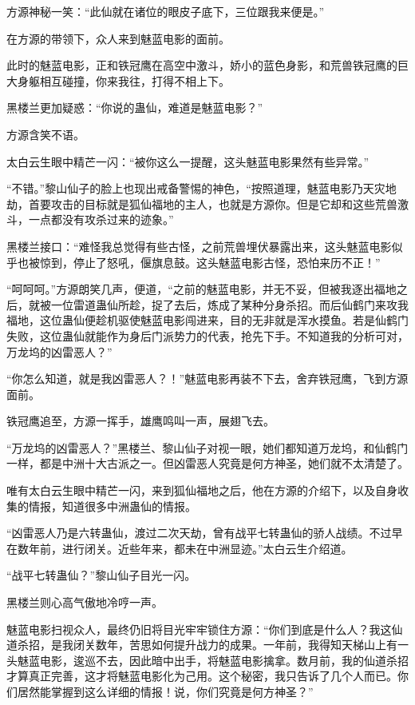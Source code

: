 
\begin{this_body}

方源神秘一笑：“此仙就在诸位的眼皮子底下，三位跟我来便是。”

在方源的带领下，众人来到魅蓝电影的面前。

此时的魅蓝电影，正和铁冠鹰在高空中激斗，娇小的蓝色身影，和荒兽铁冠鹰的巨大身躯相互碰撞，你来我往，打得不相上下。

黑楼兰更加疑惑：“你说的蛊仙，难道是魅蓝电影？”

方源含笑不语。

太白云生眼中精芒一闪：“被你这么一提醒，这头魅蓝电影果然有些异常。”

“不错。”黎山仙子的脸上也现出戒备警惕的神色，“按照道理，魅蓝电影乃天灾地劫，首要攻击的目标就是狐仙福地的主人，也就是方源你。但是它却和这些荒兽激斗，一点都没有攻杀过来的迹象。”

黑楼兰接口：“难怪我总觉得有些古怪，之前荒兽埋伏暴露出来，这头魅蓝电影似乎也被惊到，停止了怒吼，偃旗息鼓。这头魅蓝电影古怪，恐怕来历不正！”

“呵呵呵。”方源朗笑几声，便道，“之前的魅蓝电影，并无不妥，但被我逐出福地之后，就被一位雷道蛊仙所趁，捉了去后，炼成了某种分身杀招。而后仙鹤门来攻我福地，这位蛊仙便趁机驱使魅蓝电影闯进来，目的无非就是浑水摸鱼。若是仙鹤门失败，这位蛊仙就能作为身后门派势力的代表，抢先下手。不知道我的分析可对，万龙坞的凶雷恶人？”

“你怎么知道，就是我凶雷恶人？！”魅蓝电影再装不下去，舍弃铁冠鹰，飞到方源面前。

铁冠鹰追至，方源一挥手，雄鹰鸣叫一声，展翅飞去。

“万龙坞的凶雷恶人？”黑楼兰、黎山仙子对视一眼，她们都知道万龙坞，和仙鹤门一样，都是中洲十大古派之一。但凶雷恶人究竟是何方神圣，她们就不太清楚了。

唯有太白云生眼中精芒一闪，来到狐仙福地之后，他在方源的介绍下，以及自身收集的情报，知道很多中洲蛊仙的情报。

“凶雷恶人乃是六转蛊仙，渡过二次天劫，曾有战平七转蛊仙的骄人战绩。不过早在数年前，进行闭关。近些年来，都未在中洲显迹。”太白云生介绍道。

“战平七转蛊仙？”黎山仙子目光一闪。

黑楼兰则心高气傲地冷哼一声。

魅蓝电影扫视众人，最终仍旧将目光牢牢锁住方源：“你们到底是什么人？我这仙道杀招，是我闭关数年，苦思如何提升战力的成果。一年前，我得知天梯山上有一头魅蓝电影，逡巡不去，因此暗中出手，将魅蓝电影擒拿。数月前，我的仙道杀招才算真正完善，这才将魅蓝电影化为己用。这个秘密，我只告诉了几个人而已。你们居然能掌握到这么详细的情报！说，你们究竟是何方神圣？”


\end{this_body}

